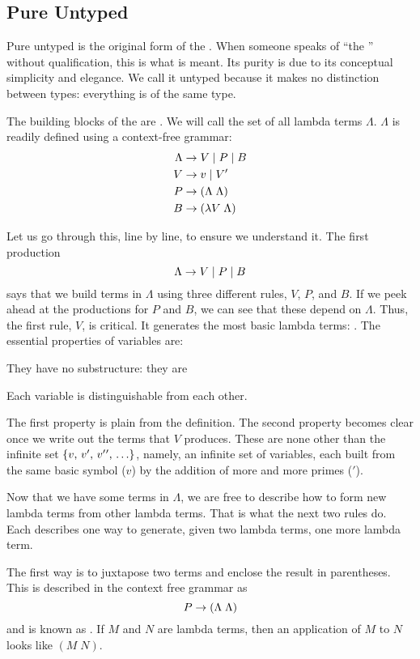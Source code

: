 \subsection{Pure Untyped \LambdaCalc}
Pure untyped \lambdacalc is the original form of the \lambdacalc{}. When someone speaks of ``the \lambdacalc{}'' without qualification, this is what is meant. Its purity is due to its conceptual simplicity and elegance. We call it untyped because it makes no distinction between types: everything is of the same type.

The building blocks of the \lambdacalc are . We will call the set of all lambda terms $\Lambda$. $\Lambda$ is readily defined using a context-free grammar:
\begin{align*}
\Lambda &\produces V \alt P \alt B\\
V &\produces v \alt V\prime\\
P &\produces (\Lambda \; \Lambda)\\
B &\produces (\lambda V \; \Lambda)
\end{align*}

Let us go through this, line by line, to ensure we understand it. The first production
\[
\Lambda \rightarrow V \mid P \mid B
\]
says that we build terms in $\Lambda$ using three different rules, $V$, $P$, and $B$. If we peek ahead at the productions for $P$ and $B$, we can see that these depend on $\Lambda$. Thus, the first rule, $V$, is critical. It generates the most basic lambda terms: . The essential properties of variables are:
\begin{aenumerate}
\item They have no substructure: they are 
\item Each variable is distinguishable from each other.
\end{aenumerate}
The first property is plain from the definition. The second property becomes clear once we write out the terms that $V$ produces. These are none other than the infinite set $\set{v,\, v\prime,\, v\prime\prime,\, \dotsc}$, namely, an infinite set of variables, each built from the same basic symbol ($v$) by the addition of more and more primes ($\prime$).

Now that we have some terms in $\Lambda$, we are free to describe how to form new lambda terms from other lambda terms. That is what the next two rules do. Each describes one way to generate, given two lambda terms, one more lambda term.

The first way is to juxtapose two terms and enclose the result in parentheses. This is described in the context free grammar as
\[
P \rightarrow (\Lambda \; \Lambda)
\]
and is known as . If $M$ and $N$ are lambda terms, then an application of $M$ to $N$ looks like $(M \; N)$.

